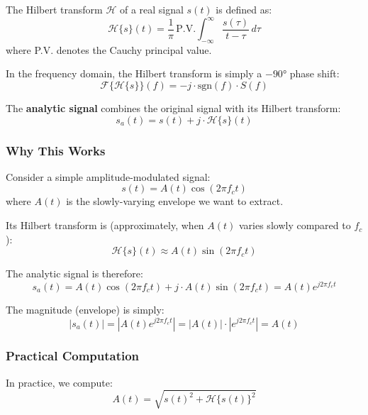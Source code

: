 \documentclass[11pt]{article}
\begin{document}
The Hilbert transform $\mathcal{H}$ of a real signal $s(t)$ is defined as:
\begin{equation}
    \mathcal{H}\{s\}(t) = \frac{1}{\pi} \, \text{P.V.} \int_{-\infty}^{\infty} \frac{s(\tau)}{t - \tau} \, d\tau
\end{equation}
where P.V. denotes the Cauchy principal value.

In the frequency domain, the Hilbert transform is simply a $-90°$ phase shift:
\begin{equation}
    \mathcal{F}\{\mathcal{H}\{s\}\}(f) = -j \cdot \text{sgn}(f) \cdot S(f)
\end{equation}

The \textbf{analytic signal} combines the original signal with its Hilbert transform:
\begin{equation}
    s_a(t) = s(t) + j \cdot \mathcal{H}\{s\}(t)
\end{equation}

\subsubsection{Why This Works}

Consider a simple amplitude-modulated signal:
\begin{equation}
    s(t) = A(t) \cos(2\pi f_c t)
\end{equation}
where $A(t)$ is the slowly-varying envelope we want to extract.

Its Hilbert transform is (approximately, when $A(t)$ varies slowly compared to $f_c$):
\begin{equation}
    \mathcal{H}\{s\}(t) \approx A(t) \sin(2\pi f_c t)
\end{equation}

The analytic signal is therefore:
\begin{equation}
    s_a(t) = A(t) \cos(2\pi f_c t) + j \cdot A(t) \sin(2\pi f_c t) = A(t) e^{j 2\pi f_c t}
\end{equation}

The magnitude (envelope) is simply:
\begin{equation}
    |s_a(t)| = |A(t) e^{j 2\pi f_c t}| = |A(t)| \cdot |e^{j 2\pi f_c t}| = A(t)
\end{equation}

\subsubsection{Practical Computation}

In practice, we compute:
\begin{equation}
    A(t) = \sqrt{s(t)^2 + \mathcal{H}\{s(t)\}^2}
\end{equation}
\end{document}
